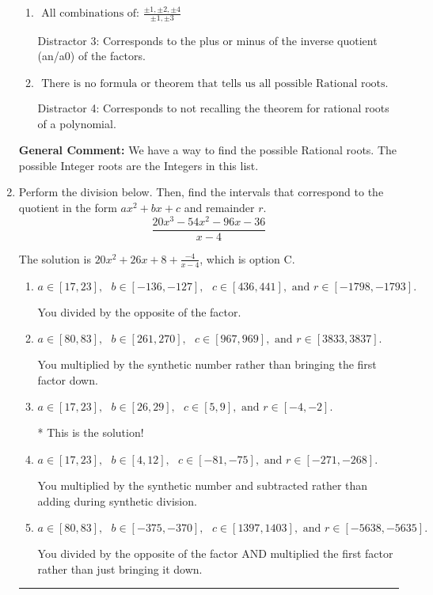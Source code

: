 \documentclass{extbook}[14pt]
\newcommand{\litem}[1]{\item #1

\rule{\textwidth}{0.4pt}}
\begin{document}
\begin{enumerate}
{\begin{enumerate}[label=\Alph*.]
 Distractor 1: Corresponds to the plus or minus factors of a1 only.
\item \( \text{ All combinations of: }\frac{\pm 1,\pm 2,\pm 4}{\pm 1,\pm 3} \)

 Distractor 3: Corresponds to the plus or minus of the inverse quotient (an/a0) of the factors. 
\item \( \text{ There is no formula or theorem that tells us all possible Rational roots.} \)

 Distractor 4: Corresponds to not recalling the theorem for rational roots of a polynomial.
\end{enumerate}

\textbf{General Comment:} We have a way to find the possible Rational roots. The possible Integer roots are the Integers in this list.
}
\litem{
Perform the division below. Then, find the intervals that correspond to the quotient in the form $ax^2+bx+c$ and remainder $r$.
\[ \frac{20x^{3} -54 x^{2} -96 x -36}{x -4} \]

The solution is \( 20x^{2} +26 x + 8 + \frac{-4}{x -4} \), which is option C.\begin{enumerate}[label=\Alph*.]
\item \( a \in [17, 23], \text{   } b \in [-136, -127], \text{   } c \in [436, 441], \text{   and   } r \in [-1798, -1793]. \)

 You divided by the opposite of the factor.
\item \( a \in [80, 83], \text{   } b \in [261, 270], \text{   } c \in [967, 969], \text{   and   } r \in [3833, 3837]. \)

 You multiplied by the synthetic number rather than bringing the first factor down.
\item \( a \in [17, 23], \text{   } b \in [26, 29], \text{   } c \in [5, 9], \text{   and   } r \in [-4, -2]. \)

* This is the solution!
\item \( a \in [17, 23], \text{   } b \in [4, 12], \text{   } c \in [-81, -75], \text{   and   } r \in [-271, -268]. \)

 You multiplied by the synthetic number and subtracted rather than adding during synthetic division.
\item \( a \in [80, 83], \text{   } b \in [-375, -370], \text{   } c \in [1397, 1403], \text{   and   } r \in [-5638, -5635]. \)

 You divided by the opposite of the factor AND multiplied the first factor rather than just bringing it down.
\end{enumerate}

}
\end{enumerate}
\end{document}
